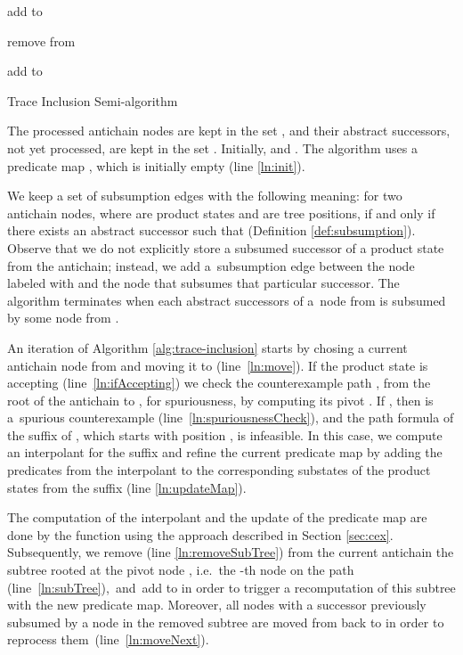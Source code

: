 \documentclass{llncs}
\begin{document}
\begin{algorithm}[t!]
{\begin{algorithmic}[1]
  \EndFor

  \For{}
  
  \State add  to \label{ln:addSubSubsume}

  \EndFor

  \State remove  from \label{ln:removeRem}

  \State add  to \label{ln:addNext}

  \EndIf

  \EndFor

  \EndIf

  \EndWhile\label{ln:endWhile}
\end{algorithmic}}
\caption{Trace Inclusion Semi-algorithm}\label{alg:trace-inclusion}
\end{algorithm}

The processed antichain nodes are kept in the set ,
and their abstract successors, not yet processed, are kept in the set
. Initially,  and
. The algorithm
uses a predicate map , which is initially empty (line
\ref{ln:init}).



We keep a set of subsumption edges  with the following meaning:
 for two antichain
nodes, where  are product states and  are tree
positions, if and only if there exists an abstract successor  such that  (Definition
\ref{def:subsumption}). Observe that we do not explicitly store a
subsumed successor of a product state  from the antichain; instead,
we add a~subsumption edge between the node labeled with  and the
node that subsumes that particular successor. The algorithm terminates
when each abstract successors of a~node from  is
subsumed by some node from .



An iteration of Algorithm \ref{alg:trace-inclusion} starts by chosing a current
antichain node  from  and moving it to
 (line~\ref{ln:move}). If the product state  is accepting
(line~\ref{ln:ifAccepting}) we check the counterexample path , from the
root of the antichain to , for spuriousness, by computing its
pivot . If , then  is a~spurious counterexample
(line~\ref{ln:spuriousnessCheck}), and the path formula of the suffix of ,
which starts with position , is infeasible. In this case, we compute an
interpolant for the suffix and refine the current predicate map  by adding
the predicates from the interpolant to the corresponding substates of the
product states from the suffix (line \ref{ln:updateMap}).

The computation of the interpolant and the update of the predicate map are
done by the  function using the
approach described in Section \ref{sec:cex}. Subsequently, we remove (line
\ref{ln:removeSubTree}) from the current antichain the subtree rooted at the
pivot node , i.e.\ the -th node on the path 
(line~\ref{ln:subTree}),~and~add  to  in order to trigger
a recomputation of this subtree with the new predicate map. Moreover, all nodes
with a successor previously subsumed by a node in the removed subtree are moved
from  back to  in order to reprocess
them~(line~\ref{ln:moveNext}).
\end{document}
